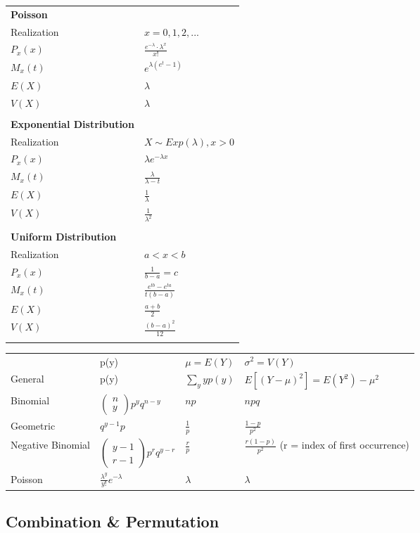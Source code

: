 \documentclass[12pt]{article}
\newcommand\mm[1]{\begin{pmatrix}#1\end{pmatrix}}
\newcommand{\bbb}[1]{\left[#1\right]}
\begin{document}
\newpage
\begin{tabularx}{\textwidth}{X | X}
	\textbf{Poisson} \\
	Realization & $x = 0, 1, 2, ...$ \\
	$P_x(x)$ & $\frac{e^{-\lambda} \cdot \lambda^x}{x!}$ \\
	$M_x(t)$ & $e^{\lambda (e^t - 1)}$ \\
	$E(X)$ & $\lambda$ \\
	$V(X)$ & $\lambda$ \\\\
	\textbf{Exponential Distribution} \\
	Realization & $X \sim Exp(\lambda), x > 0$ \\
	$P_x(x)$ & $\lambda e^{-\lambda x}$ \\
	$M_x(t)$ & $\frac{\lambda}{\lambda - t}$ \\
	$E(X)$ & $\frac{1}{\lambda}$ \\
	$V(X)$ & $\frac{1}{\lambda^2}$ \\\\
	\textbf{Uniform Distribution} \\
	Realization & $a < x < b$ \\
	$P_x(x)$ & $\frac{1}{b - a} = c$ \\
	$M_x(t)$ & $\frac{e^{tb} - e^{ta}}{t(b - a)}$ \\
	$E(X)$ & $\frac{a + b}{2}$ \\
	$V(X)$ & $\frac{(b - a)^2}{12}$ \\\\
\end{tabularx}

\begin{tabularx}{\textwidth}{l | l | l | l}
	& p(y) & $\mu = E(Y)$ & $\sigma^2 = V(Y)$ \\
	General & p(y) & $\sum_y yp(y)$ & $E \bbb{(Y - \mu)^2} = E(Y^2) - \mu^2$ \\
	Binomial & $\mm{n \\ y}p^yq^{n-y}$ & $np$ & $npq$ \\
	Geometric & $q^{y - 1}p$ & $\frac{1}{p}$ & $\frac{1 - p}{p^2}$ \\
	Negative Binomial & $\mm{y - 1 \\ r - 1} p^r q^{y - r}$ & $\frac{r}{p}$ & $\frac{r(1 - p)}{p^2}$ \quad (r = index of first occurrence) \\
	Poisson & $\frac{\lambda^y}{y!} e^{-\lambda}$ & $\lambda$ & $\lambda$
\end{tabularx}

\subsection{Combination \& Permutation}
\end{document}
